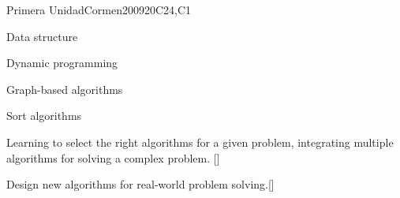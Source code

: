 \begin{syllabus}
\begin{unit}{Primera Unidad}{}{Cormen2009}{20}{C24,C1}
\begin{topics}
        \item Data structure
        \item Dynamic programming
        \item Graph-based algorithms
        \item Sort algorithms
\end{topics}
\begin{learningoutcomes}
        \item Learning to select the right algorithms for a given problem, integrating multiple algorithms for solving a complex problem. [\Usage]
	\item Design new algorithms for real-world problem solving.[\Usage]
\end{learningoutcomes}
\end{unit}

\begin{coursebibliography}
\end{coursebibliography}

\end{syllabus}
